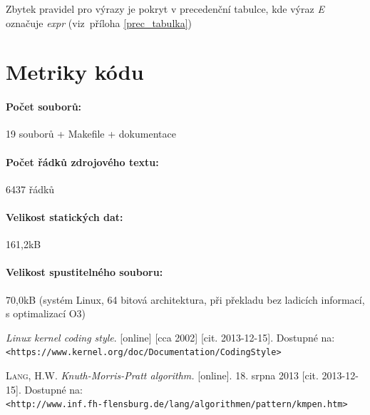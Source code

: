 \documentclass[12pt,a4paper,titlepage,final]{article}
\newcommand{\exitem}[1]{\textlangle \emph{#1}\textrangle}
\begin{document}
\begin{center}
\vspace{6pt}
Zbytek pravidel pro výrazy je pokryt v precedenční tabulce, kde výraz \emph{E}
označuje \exitem{expr} (viz~příloha \ref{prec_tabulka})
\end{center}


\section{Metriky kódu} \label{metriky}
\paragraph{Počet souborů:} 19 souborů + Makefile + dokumentace
\paragraph{Počet řádků zdrojového textu:} 6437 řádků
\paragraph{Velikost statických dat:} 161,2kB
\paragraph{Velikost spustitelného souboru:} 70,0kB (systém Linux, 64 bitová
architektura, při překla\-du bez ladicích informací, s optimalizací O3)

\newpage
 \begin{thebibliography}{1}

 \emph{Linux kernel coding style}. [online] [cca 2002] [cit. 2013-12-15].
 Dostupné na:
  \texttt{\textless https://www.kernel.org/doc/Documentation/CodingStyle\textgreater}

 \textsc{Lang, H.W.} \emph{Knuth-Morris-Pratt algorithm.} [online]. 
 18. srpna 2013 [cit. 2013-12-15]. Dostupné na: \\
 \texttt{\textless http://www.inf.fh-flensburg.de/lang/algorithmen/pattern/kmpen.htm\textgreater}



 \end{thebibliography}
\end{document}
